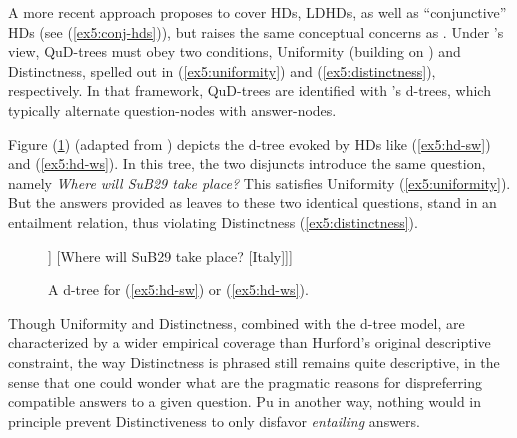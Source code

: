 A more recent approach \parencite{Zhang2022} proposes to cover HDs, LDHDs, as well as ``conjunctive'' HDs (see (\ref{ex5:conj-hds})), but raises the same conceptual concerns as \textcite{Ippolito2019}. Under \citeauthor{Zhang2022}'s view, QuD-trees must obey two conditions, Uniformity (building on ) and Distinctness, spelled out in (\ref{ex5:uniformity}) and (\ref{ex5:distinctness}), respectively. In that framework, QuD-trees are identified with \citeauthor{Buring2003}'s d-trees, which typically alternate question-nodes with answer-nodes.

\begin{exe}
	\label{ex5:uniformity}
	\label{ex5:distinctness}
\end{exe}


Figure (\ref{fig5:dtree-noto-or-italy}) (adapted from ) depicts the d-tree evoked by HDs like (\ref{ex5:hd-sw}) and (\ref{ex5:hd-ws}). In this tree, the two disjuncts introduce the same question, namely \textit{Where will SuB29 take place?} This satisfies Uniformity (\ref{ex5:uniformity}). But the answers provided as leaves to these two identical questions, stand in an entailment relation, thus violating Distinctness (\ref{ex5:distinctness}).

\begin{figure}[H]
	\centering
	\begin{forest}
		[{Where will SuB29 take place?} [{Where will SuB29 take place?} [Noto]] [{Where will SuB29 take place?} [Italy]]]
	\end{forest}
	\caption[]{A d-tree for (\ref{ex5:hd-sw}) or (\ref{ex5:hd-ws}).}\label{fig5:dtree-noto-or-italy}
\end{figure}

Though Uniformity and Distinctness, combined with the d-tree model, are characterized by a wider empirical coverage than Hurford's original descriptive constraint, the way Distinctness is phrased still remains quite descriptive, in the sense that one could wonder what are the pragmatic reasons for dispreferring compatible answers to a given question. Pu in another way, nothing would in principle prevent Distinctiveness to only disfavor \textit{entailing} answers.\\

